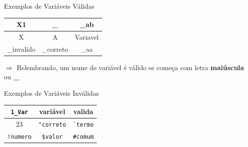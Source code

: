 \begin{frame}[fragile]
	
	\begin{block}{Exemplos de Variáveis Válidas}
		
		\begin{center}
			\begin{tabular}{c|c|c}\hline
				X1 & \textbf{\_} & \_ab \\ \hline
				X & A & Variavel \\ \hline
				\_invalido & \_correto & \_aa \\ \hline
			\end{tabular}
		\end{center}
		
	$\Rightarrow $	Relembrando, um nome de variável é válido se começa com letra \textbf{maiúscula} ou \textbf{\_}
		
	\end{block}
	
\end{frame}


\begin{frame}[fragile]
	
	\begin{block}{Exemplos de Variáveis Inválidas}
		
		\begin{center}
			\begin{tabular}{c|c|c}\hline
				\verb!1_Var! & variável & valida\\ \hline
				$23$ & \verb!"correto! & \verb!`termo!\\ \hline
				\verb+!numero+ & \verb!$valor! & \verb!#comum!\\ \hline
			\end{tabular}
		\end{center}
		
		
	\end{block}
	
\end{frame}


